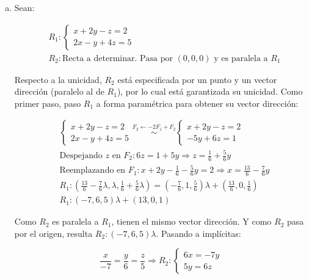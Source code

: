 \documentclass{article}
\begin{document}
\begin{enumerate}[(a)]

\item Sean:

\begin{subequations}
\begin{align}
& R_1: \left\{ \begin{array}{ll}
x + 2y - z = 2 \\
2x - y + 4z = 5
\end{array} \right. \\
& R_2: \text{Recta a determinar. Pasa por } (0, 0, 0) \text{ y es paralela a } R_1
\end{align}
\end{subequations}

Respecto a la unicidad, $R_2$ está especificada por un punto y un vector dirección (paralelo al de $R_1$), por lo cual está garantizada su unicidad. Como primer paso, paso $R_1$ a forma paramétrica para obtener su vector dirección:

\begin{subequations}
\begin{align}
& \left\{ \begin{array}{l}
x + 2y -z = 2 \\
2x - y + 4z =5
\end{array} \right. \overset{F_2 \leftarrow -2F_1 + F_2}{\sim} \left\{ \begin{array}{rr}
x + 2y - z = 2 \\
-5y + 6z = 1
\end{array} \right. \\
& \text{Despejando } z \text{ en } F_2: 6z = 1 + 5y \Rightarrow z = \frac{1}{6} + \frac{5}{6} y \\
& \text{Reemplazando en } F_1: x + 2y - \frac{1}{6} -\frac{5}{6} y = 2 \Rightarrow x = \frac{13}{6} - \frac{7}{6} y \\
& R_1 : \left(\frac{13}{6} - \frac{7}{6} \lambda, \lambda, \frac{1}{6} + \frac{5}{6} \lambda \right) = \left(-\frac{7}{6}, 1, \frac{5}{6}\right) \lambda + \left(\frac{13}{6}, 0, \frac{1}{6}\right) \\
& R_1: (-7, 6, 5) \lambda + (13, 0, 1)
\end{align}
\end{subequations}

Como $R_2$ es paralela a $R_1$, tienen el mismo vector dirección. Y como $R_2$ pasa por el origen, resulta $R_2: (-7, 6, 5) \lambda $. Pasando a implícitas:

\begin{equation}
\frac{x}{-7} = \frac{y}{6} = \frac{z}{5} \Rightarrow R_2: \left\{ \begin{array}{ll}
6x = -7y \\
5y = 6z
\end{array} \right.
\end{equation}


\end{enumerate}
\end{document}

